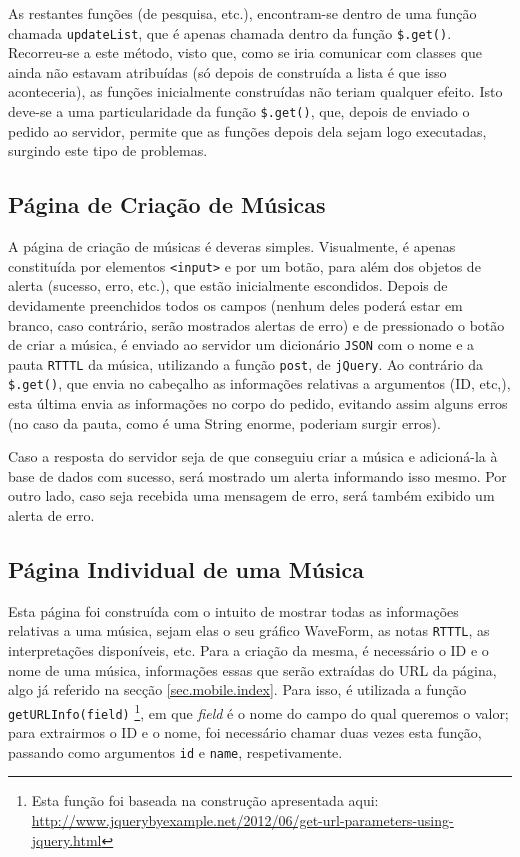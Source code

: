 \documentclass[a4paper,11pt,openright,oneside]{report}
\begin{document}
As restantes funções (de pesquisa, etc.), encontram-se dentro de uma função chamada \texttt{updateList}, que é apenas chamada dentro da função \texttt{\$.get()}. Recorreu-se a este método, visto que, como se iria comunicar com classes que ainda não estavam atribuídas (só depois de construída a lista é que isso aconteceria), as funções inicialmente construídas não teriam qualquer efeito. Isto deve-se a uma particularidade da função \texttt{\$.get()}, que, depois de enviado o pedido ao servidor, permite que as funções depois dela sejam logo executadas, surgindo este tipo de problemas.

\subsection{Página de Criação de Músicas}
\label{sec.mobile.createsong}

A página de criação de músicas é deveras simples. Visualmente, é apenas constituída por elementos \texttt{<input>} e por um botão, para além dos objetos de alerta (sucesso, erro, etc.), que estão inicialmente escondidos. Depois de devidamente preenchidos todos os campos (nenhum deles poderá estar em branco, caso contrário, serão mostrados alertas de erro) e de pressionado o botão de criar a música, é enviado ao servidor um dicionário \verb|JSON| com o nome e a pauta \verb|RTTTL| da música, utilizando a função \texttt{post}, de \verb|jQuery|. Ao contrário da \texttt{\$.get()}, que envia no cabeçalho as informações relativas a argumentos (ID, etc,), esta última envia as informações no corpo do pedido, evitando assim alguns erros (no caso da pauta, como é uma String enorme, poderiam surgir erros).

Caso a resposta do servidor seja de que conseguiu criar a música e adicioná-la à base de dados com sucesso, será mostrado um alerta informando isso mesmo. Por outro lado, caso seja recebida uma mensagem de erro, será também exibido um alerta de erro.

\subsection{Página Individual de uma Música}
\label{sec.mobile.songpage}

Esta página foi construída com o intuito de mostrar todas as informações relativas a uma música, sejam elas o seu gráfico WaveForm, as notas \verb|RTTTL|, as interpretações disponíveis, etc. Para a criação da mesma, é necessário o ID e o nome de uma música, informações essas que serão extraídas do URL da página, algo já referido na secção \autoref{sec.mobile.index}. Para isso, é utilizada a função \texttt{getURLInfo(field)} \footnote{Esta função foi baseada na construção apresentada aqui: \url{http://www.jquerybyexample.net/2012/06/get-url-parameters-using-jquery.html}}, em que \textit{field} é o nome do campo do qual queremos o valor; para extrairmos o ID e o nome, foi necessário chamar duas vezes esta função, passando como argumentos \texttt{id} e \texttt{name}, respetivamente.
\end{document}
